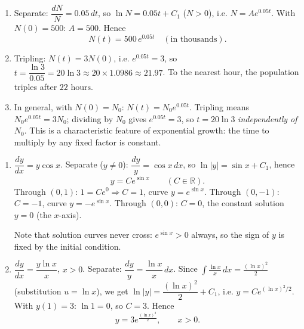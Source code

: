 \documentclass[11pt]{article}
\newcommand{\legende}[1]{\par\vspace{6pt}{\popsemi\fontsize{9}{11.5}\selectfont\color{popmuted}#1}}
\begin{document}
\begin{corrige}
\begin{enumerate}
\item Separate: $\dfrac{dN}{N}=0.05\,dt$, so $\ln N=0.05t+C_1$ ($N>0$), i.e. $N=Ae^{0.05t}$. With $N(0)=500$: $A=500$. Hence
\[ \boxed{N(t)=500\,e^{0.05t}} \quad (\text{in thousands}). \]
\item Tripling: $N(t)=3N(0)$, i.e. $e^{0.05t}=3$, so $t=\dfrac{\ln 3}{0.05}=20\ln 3\approx 20\times 1.0986\approx 21.97$. To the nearest hour, the population triples after $\boxed{22\text{ hours}}$.
\item In general, with $N(0)=N_0$: $N(t)=N_0e^{0.05t}$. Tripling means $N_0e^{0.05t}=3N_0$; dividing by $N_0$ gives $e^{0.05t}=3$, so $t=20\ln 3$ \emph{independently of $N_0$}. This is a characteristic feature of exponential growth: the time to multiply by any fixed factor is constant.
\end{enumerate}
\end{corrige}

\begin{corrige}
\begin{enumerate}
\item $\dfrac{dy}{dx}=y\cos x$. Separate ($y\neq 0$): $\dfrac{dy}{y}=\cos x\,dx$, so $\ln|y|=\sin x+C_1$, hence
\[ y=Ce^{\sin x} \qquad (C\in\mathbb{R}). \]
Through $(0,1)$: $1=Ce^{0}\Rightarrow C=1$, curve $y=e^{\sin x}$.
Through $(0,-1)$: $C=-1$, curve $y=-e^{\sin x}$.
Through $(0,0)$: $C=0$, the constant solution $y=0$ (the $x$-axis).
\begin{popfigure}
\begin{center}
\end{center}
\legende{Curves $y=e^{\sin x}$ (blue), $y=-e^{\sin x}$ (orange), $y=0$ (green)}
\end{popfigure}
Note that solution curves never cross: $e^{\sin x}>0$ always, so the sign of $y$ is fixed by the initial condition.
\item $\dfrac{dy}{dx}=\dfrac{y\ln x}{x}$, $x>0$. Separate: $\dfrac{dy}{y}=\dfrac{\ln x}{x}\,dx$. Since $\displaystyle\int\frac{\ln x}{x}\,dx=\frac{(\ln x)^{2}}{2}$ (substitution $u=\ln x$), we get $\ln|y|=\dfrac{(\ln x)^{2}}{2}+C_1$, i.e. $y=Ce^{(\ln x)^{2}/2}$. With $y(1)=3$: $\ln 1=0$, so $C=3$. Hence
\[ \boxed{y=3e^{\frac{(\ln x)^{2}}{2}}},\qquad x>0. \]
\end{enumerate}
\end{corrige}
\end{document}
